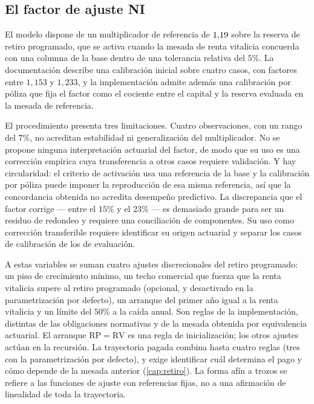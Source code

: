\subsection{El factor de ajuste NI}

El modelo dispone de un multiplicador de referencia de $1{,}19$ sobre la
reserva de retiro programado, que se activa cuando la mesada de renta vitalicia
concuerda con una columna de la base dentro de una tolerancia relativa del $5\%$.
La documentación describe una calibración inicial sobre cuatro casos, con factores
entre $1{,}153$ y $1{,}233$, y la implementación admite además una calibración por
póliza que fija el factor como el cociente entre el capital y la reserva evaluada
en la mesada de referencia.

\begin{criticism}
\label{crit:factor-ni}
El procedimiento presenta tres limitaciones. Cuatro
observaciones, con un rango del $7\%$, no acreditan estabilidad ni generalización
del multiplicador. No se propone ninguna interpretación actuarial del factor, de
modo que su uso es una corrección empírica cuya transferencia a otros casos
requiere validación. Y hay circularidad: el criterio de activación usa una
referencia de la base y la calibración por póliza puede imponer la reproducción de
esa misma referencia, así que la concordancia obtenida no acredita desempeño
predictivo. La discrepancia que el factor corrige --- entre el $15\%$ y el
$23\%$ --- es demasiado grande para ser un residuo de redondeo y requiere una
conciliación de componentes. Su uso como corrección transferible requiere
identificar su origen actuarial y separar los casos de calibración de los de
evaluación.
\end{criticism}

A estas variables se suman cuatro ajustes discrecionales del retiro programado:
un piso de crecimiento mínimo, un techo comercial que fuerza que la renta
vitalicia supere al retiro programado (opcional, y desactivado en la
parametrización por defecto), un arranque del primer año igual a la renta
vitalicia y un límite del $50\%$ a la caída anual. Son reglas de la
implementación, distintas de las obligaciones normativas y de la mesada obtenida
por equivalencia actuarial. El arranque $\mathrm{RP}=\mathrm{RV}$ es una regla
de inicialización; los otros ajustes actúan en la recursión. La trayectoria pagada
combina hasta cuatro reglas (tres con la parametrización por defecto), y exige
identificar cuál determina el pago y cómo depende de la mesada anterior
(\cref{cap:retiro}). La forma afín a trozos se refiere a las funciones de ajuste
con referencias fijas, no a una afirmación de linealidad de toda la trayectoria.

